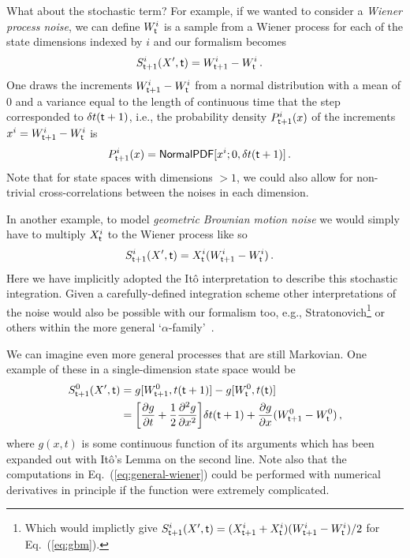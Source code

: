 \documentclass{book}
\begin{document}
What about the stochastic term? For example, if we wanted to consider a \emph{Wiener process noise}, we can define $W^i_{{\sf t}}$ is a sample from a Wiener process for each of the state dimensions indexed by $i$ and our formalism becomes
\begin{align}
& S^{i}_{{\sf t}+1}(X',{\sf t}) = W^i_{{\sf t}+1}-W^i_{\sf t} \label{eq:wiener}\,.
\end{align}
One draws the increments $W^i_{{\sf t}+1}-W^i_{\sf t}$ from a normal distribution with a mean of $0$ and a variance equal to the length of continuous time that the step corresponded to $\delta t({\sf t}+1)$, i.e., the probability density $P^i_{{\sf t}+1}(x)$ of the increments $x^i=W^i_{{\sf t}+1}-W^i_{\sf t}$ is
\begin{align}
P^i_{{\sf t}+1}(x) &= {\sf NormalPDF}[x^i;0,\delta t({\sf t}+1)] \,.
\end{align}
Note that for state spaces with dimensions $>1$, we could also allow for non-trivial cross-correlations between the noises in each dimension.

In another example, to model \emph{geometric Brownian motion noise} we would simply have to multiply $X^i_{\sf t}$ to the Wiener process like so
\begin{align}
& S^{i}_{{\sf t}+1}(X',{\sf t}) = X^i_{\sf t}(W^i_{{\sf t}+1}-W^i_{\sf t})\label{eq:gbm} \,.
\end{align}
Here we have implicitly adopted the Itô interpretation to describe this stochastic integration. Given a carefully-defined integration scheme other interpretations of the noise would also be possible with our formalism too, e.g., Stratonovich\footnote{Which would implictly give $S^{i}_{{\sf t}+1}(X',{\sf t}) = (X^i_{{\sf t}+1}+X^i_{\sf t})(W^i_{{\sf t}+1}-W^i_{\sf t}) / 2$ for Eq.~(\ref{eq:gbm}).} or others within the more general `$\alpha$-family'~\cite{van1992stochastic,risken1996fokker,rog-will-2000}.

We can imagine even more general processes that are still Markovian. One example of these in a single-dimension state space would be
\begin{align}
S^0_{{\sf t}+1}(X',{\sf t}) &= g[W^0_{{\sf t}+1},t({\sf t}+1)]-g[W^0_{\sf t}, t({\sf t})] \\
&= \bigg[ \frac{\partial g}{\partial t} + \frac{1}{2}\frac{\partial^2 g}{\partial x^2} \bigg] \delta t ({\sf t}+1) + \frac{\partial g}{\partial x} (W^0_{{\sf t}+1}-W^0_{\sf t}) \label{eq:general-wiener}\,,
\end{align}
where $g(x,t)$ is some continuous function of its arguments which has been expanded out with Itô's Lemma on the second line. Note also that the computations in Eq.~(\ref{eq:general-wiener}) could be performed with numerical derivatives in principle if the function were extremely complicated.
\end{document}
